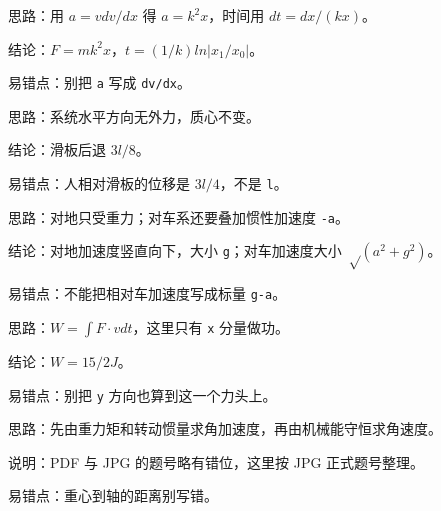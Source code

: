 \documentclass[12pt,a4paper]{ctexart}
\begin{document}
\begin{tcolorbox}[colback=white,colframe=black!55,title={一-6. 质点沿 \texttt{x} 轴运动且 \(v=kx\)，求合力与 \texttt{x} 的关系及从 \(x_0\) 到 \(x_1\) 的时间}]
思路：用 \(a=v dv/dx\) 得 \(a=k^2x\)，时间用 \(dt=dx/(kx)\)。\par
结论：\(F=mk^2x\)，\(t=(1/k)ln|x_1/x_0|\)。\par
易错点：别把 \texttt{a} 写成 \texttt{dv/dx}。\par
\end{tcolorbox}

\begin{tcolorbox}[colback=white,colframe=black!55,title={一-7. 光滑地面上，人站在滑板上从距后端 \texttt{l/4} 走到前端}]
思路：系统水平方向无外力，质心不变。\par
结论：滑板后退 \(3l/8\)。\par
易错点：人相对滑板的位移是 \(3l/4\)，不是 \texttt{l}。\par
\end{tcolorbox}

\begin{tcolorbox}[colback=white,colframe=black!55,title={一-8. 小车以恒加速度前进时，车顶螺帽脱落}]
思路：对地只受重力；对车系还要叠加惯性加速度 \texttt{-a}。\par
结论：对地加速度竖直向下，大小 \texttt{g}；对车加速度大小 \(√(a^2+g^2)\)。\par
易错点：不能把相对车加速度写成标量 \texttt{g-a}。\par
\end{tcolorbox}

\begin{tcolorbox}[colback=white,colframe=black!55,title={一-9. 已知轨迹 \(x=t, y=t^2\)，其中一力 \(F=5t i\)，求该力在 \texttt{1 s} 到 \texttt{2 s} 内做功}]
思路：\(W=∫F·v dt\)，这里只有 \texttt{x} 分量做功。\par
结论：\(W=15/2 J\)。\par
易错点：别把 \texttt{y} 方向也算到这一个力头上。\par
\end{tcolorbox}

\begin{tcolorbox}[colback=white,colframe=black!55,title={一-10. 轻杆两端固定 \texttt{m} 与 \(2m\) 小球，绕过中点且与杆垂直的水平轴在竖直面内转动}]
思路：先由重力矩和转动惯量求角加速度，再由机械能守恒求角速度。\par
说明：PDF 与 JPG 的题号略有错位，这里按 JPG 正式题号整理。\par
易错点：重心到轴的距离别写错。\par
\end{tcolorbox}
\end{document}
